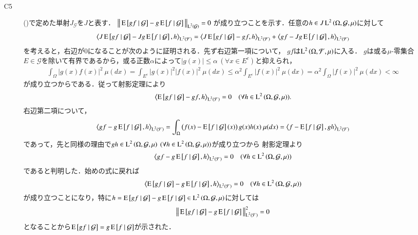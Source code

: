 \begin{prf}
\begin{description}
			\item[C5] ()で定めた単射$J_{\mathcal{G}}$を$J$と表す．
				$\left\|\, \operatorname{E} \left[ gf \ \middle|\ \mathcal{G} \right] - g\operatorname{E} \left[ f \ \middle|\ \mathcal{G} \right]\, \right\|_{\operatorname{L}^{2} \left(\mathcal{G}\right)} = 0$
				が成り立つことを示す．任意の$h \in J\operatorname{L}^{2} \left(\Omega, \mathcal{G},\mu\right)$に対して
				\begin{align}
					\inprod<J\cexp{gf}{\mathcal{G}} - Jg\cexp{f}{\mathcal{G}}, h>_{\Lp{2}{\mathcal{F}}} 
					= \inprod<J\cexp{gf}{\mathcal{G}} - gf, h>_{\Lp{2}{\mathcal{F}}} + \inprod<gf - Jg\cexp{f}{\mathcal{G}}, h>_{\Lp{2}{\mathcal{F}}}
				\end{align}
				を考えると，右辺が0になることが次のように証明される．先ず右辺第一項について，
				$gf$は$\operatorname{L}^{2} \left(\Omega, \mathcal{F},\mu\right)$に入る．
				$g$は或る$\mu$-零集合$E \in \mathcal{G}$を除いて有界であるから，或る正数$\alpha$によって$|g(x)| \leq \alpha \ (\forall x \in E^c)$と抑えられ，
				\begin{align}
					\int_{\Omega} |g(x)f(x)|^2\ \mu(dx) = \int_{E^c} |g(x)|^2|f(x)|^2\ \mu(dx) \leq \alpha^2 \int_{E^c} |f(x)|^2\ \mu(dx) = \alpha^2 \int_{\Omega} |f(x)|^2\ \mu(dx) < \infty
				\end{align}
				が成り立つからである．従って射影定理により
				\begin{align}
					\inprod<\cexp{gf}{\mathcal{G}} - gf, h>_{\Lp{2}{\mathcal{F}}} = 0 \quad (\forall h \in \Lp{2}{\Omega, \mathcal{G},\mu}).
				\end{align}
				右辺第二項について，
				\begin{align}
					\inprod<gf - g\cexp{f}{\mathcal{G}}, h>_{\Lp{2}{\mathcal{F}}} = \int_{\Omega} \left( f(x) - \cexp{f}{\mathcal{G}}(x) \right) g(x)h(x)\ \mu(dx)
					= \inprod<f - \cexp{f}{\mathcal{G}}, gh>_{\Lp{2}{\mathcal{F}}}
				\end{align}
				であって，先と同様の理由で$gh \in \operatorname{L}^{2} \left(\Omega, \mathcal{G},\mu\right) \ (\forall h \in \operatorname{L}^{2} \left(\Omega, \mathcal{G},\mu\right))$が成り立つから
				射影定理より
				\begin{align}
					\inprod<gf - g\cexp{f}{\mathcal{G}}, h>_{\Lp{2}{\mathcal{F}}} = 0  \quad (\forall h \in \Lp{2}{\Omega, \mathcal{G},\mu})
				\end{align}
				であると判明した．始めの式に戻れば
				\begin{align}
					\inprod<\cexp{gf}{\mathcal{G}} - g\cexp{f}{\mathcal{G}}, h>_{\Lp{2}{\mathcal{F}}} = 0  \quad (\forall h \in \Lp{2}{\Omega, \mathcal{G},\mu})
				\end{align}
				が成り立つことになり，特に$h = \operatorname{E} \left[ gf \ \middle|\ \mathcal{G} \right] - g\operatorname{E} \left[ f \ \middle|\ \mathcal{G} \right] \in \operatorname{L}^{2} \left(\Omega, \mathcal{G},\mu\right)$に対しては
				\begin{align}
					\left\|\, \operatorname{E} \left[ gf \ \middle|\ \mathcal{G} \right] - g\operatorname{E} \left[ f \ \middle|\ \mathcal{G} \right]\, \right\|_{\operatorname{L}^{2} \left(\mathcal{F}\right)}^2 = 0
				\end{align}
				となることから$\operatorname{E} \left[ gf \ \middle|\ \mathcal{G} \right] = g\operatorname{E} \left[ f \ \middle|\ \mathcal{G} \right]$が示された．
			

\end{description}
\end{prf}
